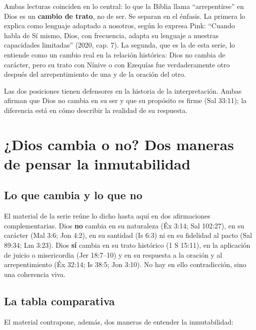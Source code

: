 \documentclass[11pt,letterpaper]{article}
\newcommand{\destacar}[1]{\textbf{\textcolor{azul}{#1}}}
\begin{document}
Ambas lecturas coinciden en lo central: lo que la Biblia llama ``arrepentirse'' en Dios es un \destacar{cambio de trato}, no de ser. Se separan en el énfasis. La primera lo explica como lenguaje adaptado a nosotros, según lo expresa Pink: ``Cuando habla de Sí mismo, Dios, con frecuencia, adapta su lenguaje a nuestras capacidades limitadas'' (2020, cap. 7). La segunda, que es la de esta serie, lo entiende como un cambio real en la relación histórica: Dios no cambia de carácter, pero su trato con Nínive o con Ezequías fue verdaderamente otro después del arrepentimiento de una y de la oración del otro.

\begin{nota}[Precisión]
Las dos posiciones tienen defensores en la historia de la interpretación. Ambas afirman que Dios no cambia en su ser y que su propósito es firme (Sal 33:11); la diferencia está en cómo describir la realidad de su respuesta.
\end{nota}

\section{¿Dios cambia o no? Dos maneras de pensar la inmutabilidad}

\subsection{Lo que cambia y lo que no}
El material de la serie reúne lo dicho hasta aquí en dos afirmaciones complementarias. Dios \textbf{no} cambia en su naturaleza (Éx 3:14; Sal 102:27), en su carácter (Mal 3:6; Jon 4:2), en su santidad (Is 6:3) ni en su fidelidad al pacto (Sal 89:34; Lm 3:23). Dios \textbf{sí} cambia en su trato histórico (1 S 15:11), en la aplicación de juicio o misericordia (Jer 18:7--10) y en su respuesta a la oración y al arrepentimiento (Éx 32:14; Is 38:5; Jon 3:10). No hay en ello contradicción, sino una coherencia viva.

\subsection{La tabla comparativa}
El material contrapone, además, dos maneras de entender la inmutabilidad:
\end{document}
